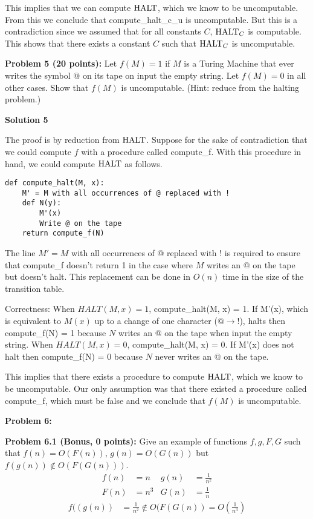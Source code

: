 \documentclass[11pt]{article}
\begin{document}
This implies that we can compute $\mathrm{HALT}$, which we know to be uncomputable. From this we conclude that compute\_halt\_c\_u is uncomputable. But this is a contradiction since we assumed that for all constants $C$, $\mathrm{HALT}_C$ is computable. This shows that there exists a constant $C$ such that $\mathrm{HALT}_C$ is uncomputable.
\newpage


\textbf{Problem 5 (20 points):} Let $f(M) = 1$ if $M$ is a Turing Machine that ever writes the symbol $@$ on its tape on input the empty string. Let $f(M) = 0$ in all other cases. Show that $f(M)$ is uncomputable. (Hint: reduce from the halting problem.)

\textbf{Solution 5}

The proof is by reduction from $\mathrm{HALT}$. Suppose for the sake of contradiction that we could compute $f$ with a procedure called compute\_f. With this procedure in hand, we could compute $\mathrm{HALT}$ as follows.

\begin{lstlisting}
def compute_halt(M, x):
    M' = M with all occurrences of @ replaced with !
    def N(y):
        M'(x)
        Write @ on the tape
    return compute_f(N)
\end{lstlisting}

The line $M' = M$ with all occurrences of @ replaced with ! is required to ensure that compute\_f doesn't return 1 in the case where $M$ writes an @ on the tape but doesn't halt. This replacement can be done in $O(n)$ time in the size of the transition table.

Correctness: When $HALT(M, x) = 1$, compute\_halt(M, x) = 1. If M'(x), which is equivalent to $M(x)$ up to a change of one character ($@ \to !$), halts then compute\_f(N) = 1 because $N$ writes an @ on the tape when input the empty string. When $HALT(M, x) = 0$, compute\_halt(M, x) = 0. If M'(x) does not halt then compute\_f(N) = 0 because $N$ never writes an @ on the tape.

This implies that there exists a procedure to compute $\mathrm{HALT}$, which we know to be uncomputable. Our only assumption was that there existed a procedure called compute\_f, which must be false and we conclude that $f(M)$ is uncomputable.


\newpage


\textbf{Problem 6:}

\textbf{Problem 6.1 (Bonus, 0 points):} Give an example of functions $f,g,F,G$ such that $f(n) = O(F(n))$, $g(n) = O(G(n))$ but $f(g(n)) \not\in O(F(G(n)))$. 
\begin{align*} 
f(n) &= n & g(n) &= \frac{1}{n^2}\\
F(n) &= n^3 & G(n) &= \frac{1}{n}
\end{align*}
\begin{align*} 
f((g(n)) &= \frac{1}{n^2} \notin O(F(G(n)) = O(\frac{1}{n^3})
\end{align*}
\end{document}
